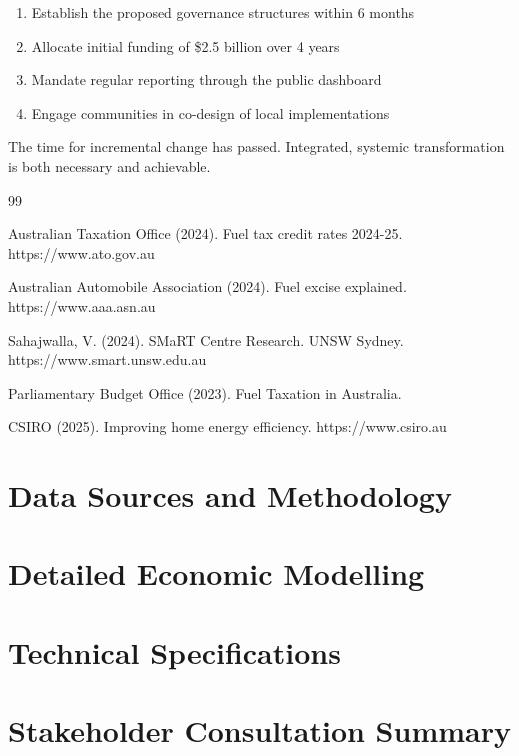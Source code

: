 \documentclass[12pt,a4paper]{article}
\begin{document}
\begin{enumerate}
    \item Establish the proposed governance structures within 6 months
    \item Allocate initial funding of \$2.5 billion over 4 years
    \item Mandate regular reporting through the public dashboard
    \item Engage communities in co-design of local implementations
\end{enumerate}

The time for incremental change has passed. Integrated, systemic transformation is both necessary and achievable.

\begin{thebibliography}{99}

 Australian Taxation Office (2024). Fuel tax credit rates 2024-25. https://www.ato.gov.au

 Australian Automobile Association (2024). Fuel excise explained. https://www.aaa.asn.au

 Sahajwalla, V. (2024). SMaRT Centre Research. UNSW Sydney. https://www.smart.unsw.edu.au

 Parliamentary Budget Office (2023). Fuel Taxation in Australia.

 CSIRO (2025). Improving home energy efficiency. https://www.csiro.au

\end{thebibliography}

\appendix

\section{Data Sources and Methodology}

\section{Detailed Economic Modelling}

\section{Technical Specifications}

\section{Stakeholder Consultation Summary}
\end{document}
